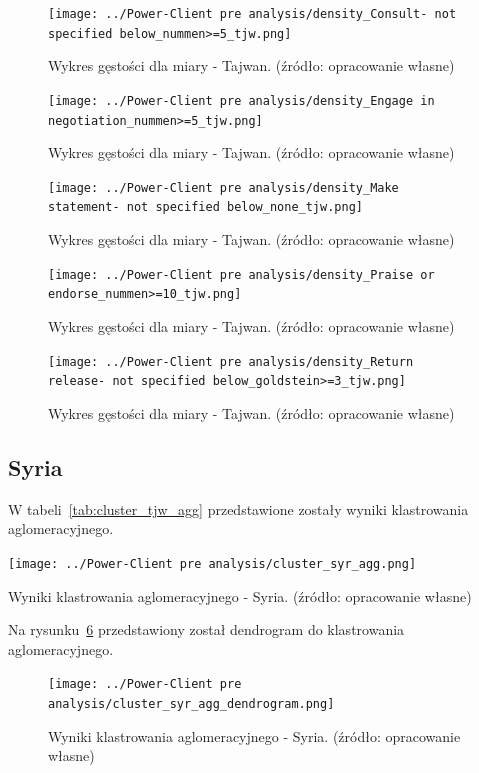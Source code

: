 \documentclass[11pt]{report}
\begin{document}
    \begin{figure}[!htp]
        \centering
        \texttt{[image: ../Power-Client pre analysis/density\_Consult- not specified below\_nummen>=5\_tjw.png]}
        \caption{Wykres gęstości dla miary - Tajwan. (źródło: opracowanie własne)}
        \label{fig:density_Consult- not specified below_nummen>=5_tjw}
    \end{figure}
    \begin{figure}[!htp]
        \centering
        \texttt{[image: ../Power-Client pre analysis/density\_Engage in negotiation\_nummen>=5\_tjw.png]}
        \caption{Wykres gęstości dla miary - Tajwan. (źródło: opracowanie własne)}
        \label{fig:density_Engage in negotiation_nummen>=5_tjw}
    \end{figure}
    \begin{figure}[!htp]
        \centering
        \texttt{[image: ../Power-Client pre analysis/density\_Make statement- not specified below\_none\_tjw.png]}
        \caption{Wykres gęstości dla miary - Tajwan. (źródło: opracowanie własne)}
        \label{fig:density_Make statement- not specified below_none_tjw}
    \end{figure}
    \begin{figure}[!htp]
        \centering
        \texttt{[image: ../Power-Client pre analysis/density\_Praise or endorse\_nummen>=10\_tjw.png]}
        \caption{Wykres gęstości dla miary - Tajwan. (źródło: opracowanie własne)}
        \label{fig:density_Praise or endorse_nummen>=10_tjw}
    \end{figure}
    \begin{figure}[!htp]
        \centering
        \texttt{[image: ../Power-Client pre analysis/density\_Return release- not specified below\_goldstein>=3\_tjw.png]}
        \caption{Wykres gęstości dla miary - Tajwan. (źródło: opracowanie własne)}
        \label{fig:density_Return release- not specified below_goldstein>=3_tjw}
    \end{figure}

    \subsection{Syria}
    W tabeli~\ref{tab:cluster_tjw_agg} przedstawione zostały wyniki klastrowania aglomeracyjnego.
    \begin{table}[!htp]
        \centering
        \texttt{[image: ../Power-Client pre analysis/cluster\_syr\_agg.png]}
        \caption{Wyniki klastrowania aglomeracyjnego - Syria. (źródło: opracowanie własne)}
        \label{tab:cluster_syr_agg}
    \end{table}
    Na rysunku~\ref{fig:cluster_syr_agg_dendrogram} przedstawiony został dendrogram do klastrowania aglomeracyjnego.
    \begin{figure}[!htp]
        \centering
        \texttt{[image: ../Power-Client pre analysis/cluster\_syr\_agg\_dendrogram.png]}
        \caption{Wyniki klastrowania aglomeracyjnego - Syria. (źródło: opracowanie własne)}
        \label{fig:cluster_syr_agg_dendrogram}
    \end{figure}
\end{document}
